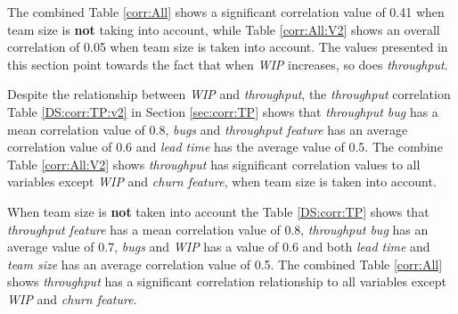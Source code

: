 \documentclass[UKenglish]{ifimaster}  %
\begin{document}
The combined Table \ref{corr:All} shows a significant correlation value of 0.41 when team size is \textbf{not} taking into account, while Table \ref{corr:All:V2} shows an overall correlation of 0.05 when team size is taken into account. The values presented in this section point towards the fact that when \textit{WIP} increases, so does \textit{throughput}.






Despite the relationship between \textit{WIP} and \textit{throughput}, the \textit{throughput} correlation Table \ref{DS:corr:TP:v2} in Section \ref{sec:corr:TP} shows that \textit{throughput bug} has a mean correlation value of 0.8, \textit{bugs} and \textit{throughput feature} has an average correlation value of 0.6 and  \textit{lead time} has the average value of 0.5.
The combine Table \ref{corr:All:V2} shows \textit{throughput} has significant correlation values to all variables except \textit{WIP} and \textit{churn feature}, when team size is taken into account.

When team size is \textbf{not} taken into account the Table \ref{DS:corr:TP} shows that \textit{throughput feature} has a mean correlation value of 0.8, \textit{throughput bug} has an average value of 0.7, \textit{bugs} and \textit{WIP} has a value of 0.6 and both \textit{lead time} and \textit{team size} has an average correlation value of 0.5. The combined Table \ref{corr:All} shows \textit{throughput} has a significant correlation relationship to all variables except \textit{WIP} and \textit{churn feature}. 
\end{document}
